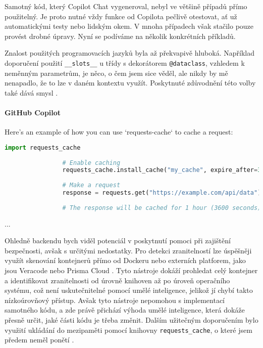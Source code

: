\documentclass[FM,DP]{tulthesis}
\begin{document}
		Samotný kód, který Copilot Chat vygeneroval, nebyl ve většině případů přímo použitelný. Je proto nutné vždy funkce od Copilota pečlivě otestovat, ať už automatickými testy nebo lidským okem. V mnoha případech však stačilo pouze provést drobné úpravy. Nyní se podíváme na několik konkrétních příkladů.
		
		Znalost použitých programovacích jazyků byla až překvapivě hluboká. Například doporučení použití \verb|__slots__| u třídy s dekorátorem \verb|@dataclass|, vzhledem k neměnným parametrům, je něco, o čem jsem sice věděl, ale nikdy by mě nenapadlo, že to lze v daném kontextu využít. Poskytnuté zdůvodnění této volby také dává smysl \cite{dataclass}.
		
		\vspace{0.6em}
		\begin{tcolorbox}[colback=white,colframe=black,title=Úprava výkonnosti třídy v Pythonu]
			\paragraph{GitHub Copilot}
			Here's an example of how you can use `requests-cache` to cache a request:
			
			\begin{lstlisting}[language=Python]
				import requests_cache
				
				# Enable caching
				requests_cache.install_cache("my_cache", expire_after=3600)
				
				# Make a request
				response = requests.get("https://example.com/api/data")
				
				# The response will be cached for 1 hour (3600 seconds)
			\end{lstlisting}
			... \cite{requests_cache}
		\end{tcolorbox}
		
		Ohledně backendu bych viděl potenciál v poskytnutí pomoci při zajištění bezpečnosti, avšak s určitými nedostatky. Pro detekci zranitelností lze úspěšněji využít skenování kontejnerů přímo od Dockeru nebo externích platforem, jako jsou Veracode nebo Prisma Cloud \cite{veracode} \cite{prisma_cloud}. Tyto nástroje dokáží prohledat celý kontejner a identifikovat zranitelnosti od úrovně knihoven až po úroveň operačního systému, což není uskutečnitelné pomocí umělé inteligence, jelikož jí chybí takto nízkoúrovňový přístup. Avšak tyto nástroje nepomohou s implementací samotného kódu, a zde právě přichází výhoda umělé inteligence, která dokáže přesně určit, jaké části kódu je třeba změnit. Dalším užitečným doporučením bylo využití ukládání do mezipaměti pomocí knihovny \verb|requests_cache|, o které jsem předem neměl ponětí \cite{webapp_basics} \cite{middleware}.
		
\end{document}
